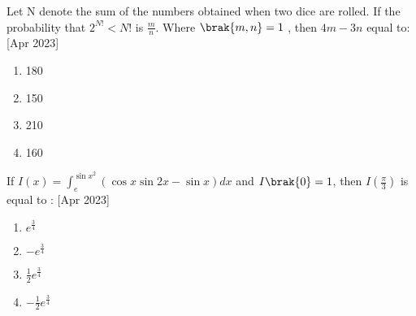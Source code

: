     \item Let N denote the sum of the numbers obtained when two dice are rolled. If the probability that $2^{N!} < N!$ is $\frac{m}{n}$. Where $\brak{m,n}=1$ , then $4m-3n$ equal to:
     \hfill{[Apr 2023]}
    \begin{multicols}{4}
            \begin{enumerate}
              \item 180
              \item 150
              \item 210
              \item 160
            \end{enumerate}
        \end{multicols}
        \item If $I(x)=\int_ e^{\sin{x}^2} (\cos{x}\sin{2x}-\sin{x}) dx$ and $I\brak{0}=1$, then $I(\frac{\pi}{3})$ is equal to :
         \hfill{[Apr 2023]}
        \begin{multicols}{4}
            \begin{enumerate}
              \item $e^{\frac{3}{4}}$
              \item $-e^{\frac{3}{4}}$
            \item $\frac{1}{2}e^{\frac{3}{4}}$
              \item $-\frac{1}{2}e^{\frac{3}{4}}$
            \end{enumerate}
        \end{multicols}

